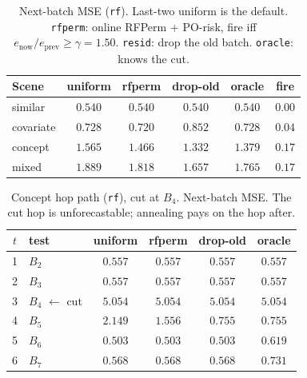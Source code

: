 
\begin{table}[ht]\centering
\caption{Next-batch MSE (\texttt{rf}). Last-two uniform is the
default. \texttt{rfperm}: online RFPerm + PO-risk, fire iff $e_{\mathrm{now}}/e_{\mathrm{prev}}\ge\gamma=1.50$.
\texttt{resid}: drop the old batch. \texttt{oracle}: knows the cut.}
\label{tab:po-refit-mse-rf}
\small
\setlength{\tabcolsep}{4pt}
\begin{tabular}{@{}lccccc@{}}\toprule
Scene & uniform & rfperm & drop-old & oracle & fire \\
\midrule
similar & $\mathbf{0.540}$ & $\mathbf{0.540}$ & $\mathbf{0.540}$ & $0.540$ & $0.00$ \\
covariate & $0.728$ & $\mathbf{0.720}$ & $0.852$ & $0.728$ & $0.04$ \\
concept & $1.565$ & $1.466$ & $\mathbf{1.332}$ & $1.379$ & $0.17$ \\
mixed & $1.889$ & $1.818$ & $\mathbf{1.657}$ & $1.765$ & $0.17$ \\
\bottomrule
\end{tabular}
\end{table}

\begin{table}[ht]\centering
\caption{Concept hop path (\texttt{rf}), cut at $B_4$.
Next-batch MSE. The cut hop is unforecastable; annealing pays on the hop after.}
\label{tab:po-refit-concept-rf}
\small
\setlength{\tabcolsep}{4pt}
\begin{tabular}{@{}clcccc@{}}\toprule
$t$ & test & uniform & rfperm & drop-old & oracle \\
\midrule
1 & $B_{2}$ & $\mathbf{0.557}$ & $\mathbf{0.557}$ & $\mathbf{0.557}$ & $0.557$ \\
2 & $B_{3}$ & $\mathbf{0.557}$ & $\mathbf{0.557}$ & $\mathbf{0.557}$ & $0.557$ \\
3 & $B_{4}$ $\leftarrow$ cut & $\mathbf{5.054}$ & $\mathbf{5.054}$ & $\mathbf{5.054}$ & $5.054$ \\
4 & $B_{5}$ & $2.149$ & $1.556$ & $\mathbf{0.755}$ & $0.755$ \\
5 & $B_{6}$ & $\mathbf{0.503}$ & $\mathbf{0.503}$ & $\mathbf{0.503}$ & $0.619$ \\
6 & $B_{7}$ & $\mathbf{0.568}$ & $\mathbf{0.568}$ & $\mathbf{0.568}$ & $0.731$ \\
\bottomrule
\end{tabular}
\end{table}

